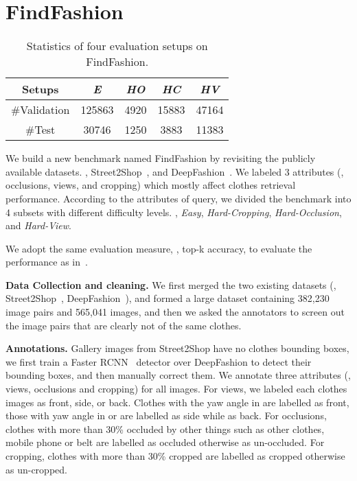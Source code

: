 \documentclass[10pt,twocolumn,letterpaper]{article}
\begin{document}
\section{FindFashion}
\begin{table}
\center
\begin{center}
\begin{tabular}{c|c|c|c|c}
\hline
Setups & \textit{E}  &  \textit{HO} & \textit{HC} & \textit{HV} \\ \hline
\#Validation& 125863   & 4920    & 15883      & 47164 \\ \hline
\#Test & 30746   & 1250    & 3883      & 11383 \\ \hline
\end{tabular}
\end{center}
\caption{Statistics of four evaluation setups on FindFashion.}
\label{tab:table_benchmark}
\end{table}

We build a new benchmark named FindFashion by revisiting the publicly available datasets. \ie, Street2Shop~\cite{Kiapour2015}, and DeepFashion~\cite{Liu2016}. We labeled 3 attributes (\ie, occlusions, views, and cropping) which mostly affect clothes retrieval performance.
According to the attributes of query, we divided the benchmark into 4 subsets with different difficulty levels. \ie, \textit{Easy}, \textit{Hard-Cropping}, \textit{Hard-Occlusion}, and \textit{Hard-View}.

We adopt the same evaluation measure, \ie, top-k accuracy, to evaluate the performance as in~\cite{Kiapour2015,Liu2016}.

\textbf{Data Collection and cleaning.}
We first merged the two existing datasets (\ie, Street2Shop~\cite{Kiapour2015}, DeepFashion~\cite{Liu2016}), and formed a large dataset containing 382,230 image pairs and 565,041 images, and then we asked the annotators to screen out the image pairs that are clearly not of the same clothes.

\textbf{Annotations.} Gallery images from Street2Shop have no clothes bounding boxes, we first train a Faster RCNN~\cite{ren2015faster} detector over DeepFashion to detect their bounding boxes, and then manually correct them. We annotate three attributes (\ie, views, occlusions and cropping) for all images.
For views, we labeled each clothes images as front, side, or back.  Clothes with the yaw angle in  are labelled as front,  those with yaw angle in   or  are labelled as side while   as back. For occlusions, clothes with more than 30\% occluded by other things such as other clothes, mobile phone or belt are labelled as occluded otherwise as un-occluded. For cropping, clothes with more than 30\% cropped are labelled as cropped otherwise as un-cropped.
\end{document}
